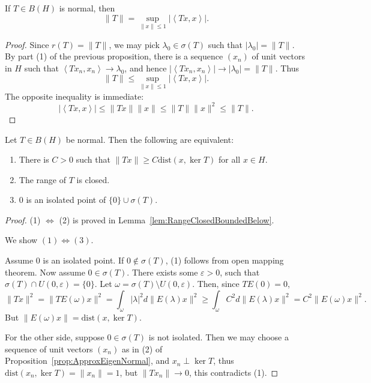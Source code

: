 \begin{corollary}
	\label{cor:NormalNorm}
	If $T \in B(H)$ is normal, then
	\[
		\|T\| = \sup _{\|x\| \le 1} \left| \left\langle Tx, x \right\rangle  \right| 
	.\]
\end{corollary}
\begin{proof}
	Since $r(T) = \|T\|$, we may pick $\lambda_0 \in \sigma(T)$ such that $|\lambda_0| = \|T\|$. By part (1) of the previous proposition, there is a sequence $(x_n)$ of unit vectors in $H$ such that $\left\langle T x_n, x_n \right\rangle  \to \lambda_0$, and hence $\left| \left\langle T x_n, x_n \right\rangle  \right|  \to  |\lambda_0| = \|T\|$. Thus
	\[
		\|T\| \le \sup _{\|x\| \le 1} \left| \left\langle Tx, x \right\rangle  \right| 
	.\] 
	The opposite inequality is immediate:
	\[
		\left| \left\langle Tx, x \right\rangle  \right| 
		\le \|Tx\| \|x\|
		\le \|T\| \|x\|^2 \le \|T\|
	.\] 
\end{proof}

\begin{corollary}
	\label{cor:NormalIsolatedZero}
	Let $T \in B(H)$ be normal. Then the following are equivalent:
	\begin{enumerate}
		\item There is  $C > 0$ such that $\|T x\| \ge C \text{dist}(x, \operatorname{ker} T)$ for all $x \in H$.
		\item The range of $T$ is closed.
		\item $0$ is an isolated point of $\{0\} \cup \sigma(T)$.
	\end{enumerate}
\end{corollary}
\begin{proof}
	(1) $\iff $ (2) is proved in Lemma~\ref{lem:RangeClosedBoundedBelow}. 

	We show $(1) \iff (3)$.

	Assume $0$ is an isolated point. If $0 \not\in \sigma(T)$, (1) follows from open mapping theorem. Now assume $0 \in \sigma(T)$. There exists some $\varepsilon>0$, such that $\sigma(T) \cap U(0,\varepsilon) = \{0\} $. Let $\omega = \sigma(T) \setminus U(0,\varepsilon)$. Then, since $T E(0) = 0$,
	\[
		\|T x\|^2
		= \|T E (\omega) x\|^2
		= \int _\omega |\lambda|^2 d \|E(\lambda)x\|^2
		\ge \int _\omega C^2 d \|E(\lambda) x\|^2
		= C^2 \|E(\omega) x\|^2
	.\] 
	But $\|E(\omega) x\| = \text{dist}(x, \operatorname{ker} T)$.

	For the other side, suppose $0 \in \sigma(T)$ is not isolated.
	Then we may choose a sequence of unit vectors $(x_n)$ as in (2) of Proposition~\ref{prop:ApproxEigenNormal}, 
	and $x_n \perp \operatorname{ker} T$, 
	thus $\text{dist}(x_n, \operatorname{ker} T) = \|x_n\| = 1$, but $\|T x_n\|\to 0$, this contradicts (1).
\end{proof}



